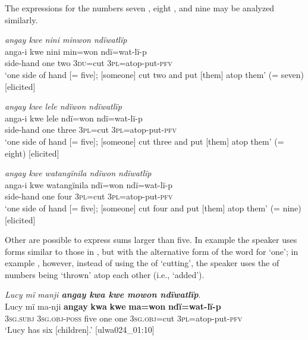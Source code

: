 The expressions for the numbers seven , eight , and nine  may be analyzed similarly.

\ea%
    \label{ex:det:216}
          \textit{angay kwe nini minwon ndïwatlïp}\\
\gll    anga-i    kwe  nini  min=won  ndï=wat-lï-p\\
    side-hand  one    two  \textsc{3du}=cut  3\textsc{pl}=atop-put-\textsc{pfv}\\
\glt `one side of hand [= five]; [someone] cut two and put [them] atop them’ (= seven) [elicited]
\z

\newpage

\ea%
    \label{ex:det:217}
          \textit{angay kwe lele ndïwon ndïwatlïp}\\
\gll    anga-i    kwe  lele    ndï=won  ndï=wat-lï-p\\
    side-hand  one    three  3\textsc{pl}=cut  3\textsc{pl}=atop-put-\textsc{pfv}\\
\glt `one side of hand [= five]; [someone] cut three and put [them] atop them’ (= eight) [elicited]
\z

\ea%
    \label{ex:det:218}
          \textit{angay kwe watangïnila ndïwon ndïwatlïp}\\
\gll    anga-i    kwe  watangïnila  ndï=won  ndï=wat-lï-p\\
    side-hand  one    four      \textsc{3pl}=cut  3\textsc{pl}=atop-put-\textsc{pfv}\\
\glt `one side of hand [= five]; [someone] cut four and put [them] atop them’ (= nine) [elicited]
\z

Other  are possible to express sums larger than five. In example  the speaker uses forms similar to those in , but with the alternative form of the word for ‘one’; in example , however, instead of using the  of ‘cutting’, the speaker uses the  of numbers being ‘thrown’ atop each other (i.e., ‘added’).

\ea%
    \label{ex:det:219}
          \textit{Lucy mï manji \textbf{angay kwa kwe mowon ndïwatlïp}}.\\
\gll Lucy  mï      ma-nji      \textbf{angay}  \textbf{kwa}  \textbf{kwe}  \textbf{ma=won} \textbf{ndï=wat-lï-p}\\
    [name]  3\textsc{sg.subj}  \textsc{3sg.obj-poss}  five  one   one    \textsc{3sg.obj}=cut    3\textsc{pl}=atop-put-\textsc{pfv}\\
\glt `Lucy has six [children].’ [ulwa024\_01:10]
\z

